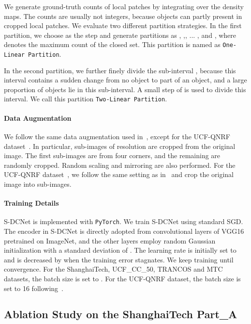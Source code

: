 \documentclass[10pt,twocolumn,letterpaper]{article}
\begin{document}
	We generate ground-truth counts of local patches by integrating over the density maps. The counts are usually not integers, because objects can partly present in cropped local patches. We evaluate two different partition strategies. In the first partition, we choose  as the step and generate partitions as , ,, ... , and , where  denotes the maximum count of the closed set. This partition is named as \texttt{One-Linear Partition}.
	
	In the second partition, we further finely divide the sub-interval , because this interval contains a sudden change from no object to part of an object, and a large proportion of objects lie in this sub-interval. A small step of  is used to divide this interval. We call this partition \texttt{Two-Linear Partition}.  
	


	
	\vspace{-10pt}
	\paragraph{Data Augmentation}
	We follow the same data augmentation used in~\cite{CSRNet_2018_CVPR}, except for the UCF-QNRF dataset~\cite{Compose_Loss_2018_ECCV}. In particular,  sub-images of  resolution are cropped from the original image. The first  sub-images are from four corners, and the remaining  are randomly cropped. Random scaling and mirroring are also performed. For the UCF-QNRF dataset~\cite{Compose_Loss_2018_ECCV}, we follow the same setting as in~\cite{Compose_Loss_2018_ECCV} and crop the original image into  sub-images.
	
	\vspace{-10pt}
	\paragraph{Training Details}
	S-DCNet is implemented with \texttt{PyTorch}. We train S-DCNet using standard SGD. The encoder in S-DCNet is directly adopted from convolutional layers of VGG16~\cite{Simonyan2014Very_VGG16} pretrained on ImageNet, and the other layers employ random Gaussian initialization with a standard deviation of . The learning rate is initially set to  and is decreased by  when the training error stagnates. We keep training until convergence. For the ShanghaiTech, UCF\_CC\_50, TRANCOS and MTC datasets, the batch size is set to . For the UCF-QNRF dataset, the batch size is set to 16 following~\cite{Compose_Loss_2018_ECCV}. 
	
	\subsection{Ablation Study on the ShanghaiTech Part\_A}
\end{document}
